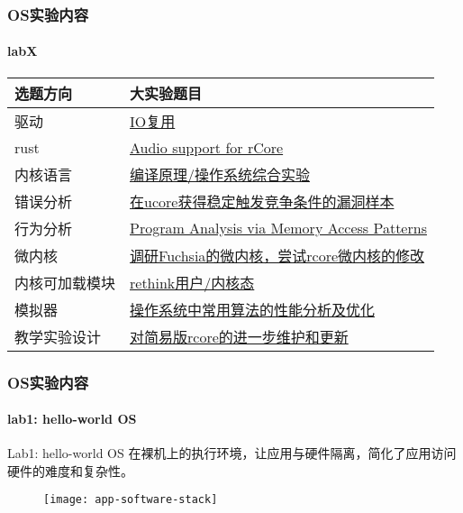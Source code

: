 \begin{frame}
	\frametitle{OS实验内容}
	\framesubtitle{labX}
	
	\begin{longtable}[]{@{}|l|l|@{}}
		\toprule
		选题方向 & 大实验题目\tabularnewline
		\midrule
		\endhead
		驱动 &
		\href{http://os.cs.tsinghua.edu.cn/oscourse/OsTrain2019/g4}{IO复用}\tabularnewline \hline
		rust &
		\href{http://os.cs.tsinghua.edu.cn/oscourse/OS2019spring/projects/g08}{Audio
			support for rCore}\tabularnewline \hline
		内核语言 &
		\href{http://os.cs.tsinghua.edu.cn/oscourse/OsTrain2019/g6}{编译原理/操作系统综合实验}\tabularnewline \hline
		错误分析 &
		\href{http://os.cs.tsinghua.edu.cn/oscourse/OS2019spring/projects/g07}{在ucore获得稳定触发竞争条件的漏洞样本}\tabularnewline \hline
		行为分析 &
		\href{http://os.cs.tsinghua.edu.cn/oscourse/OS2019spring/projects/g09}{Program
			Analysis via Memory Access Patterns}\tabularnewline \hline
		微内核 &
		\href{http://os.cs.tsinghua.edu.cn/oscourse/OsTrain2019/g1}{调研Fuchsia的微内核，尝试rcore微内核的修改}\tabularnewline \hline
		内核可加载模块 &
		\href{http://os.cs.tsinghua.edu.cn/oscourse/OsTrain2019/g5}{rethink用户/内核态}\tabularnewline \hline
		模拟器 &
		\href{http://os.cs.tsinghua.edu.cn/oscourse/OS2019spring/projects/g10}{操作系统中常用算法的性能分析及优化}\tabularnewline \hline
		教学实验设计 &
		\href{http://os.cs.tsinghua.edu.cn/oscourse/OsTrain2019/g7}{对简易版rcore的进一步维护和更新}\tabularnewline \hline
		\bottomrule
	\end{longtable}
	

\end{frame}
\begin{frame}
    \frametitle{OS实验内容}
    \framesubtitle{lab1: hello-world OS}
    \begin{block}{Lab1:  hello-world OS}
        在裸机上的执行环境，让应用与硬件隔离，简化了应用访问硬件的难度和复杂性。
    \end{block}
    
    \begin{figure}
        \centering
        \texttt{[image: app-software-stack]} %
    \end{figure}
    
\end{frame}

